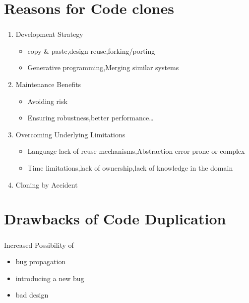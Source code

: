\documentclass[pdf]{beamer}
\begin{document}
\section{Reasons for Code clones}
\begin{frame}
\frametitle{\secname}
\begin{block}{}
\begin{enumerate}
  \item Development Strategy
  \begin{itemize}
    \item copy \& paste,design reuse,forking\slash porting
    \item Generative programming,Merging similar systems
  \end{itemize}
  \item Maintenance Benefits
  \begin{itemize}
    \item Avoiding risk
    \item Ensuring robustness,better performance\ldots
  \end{itemize}
  \item Overcoming Underlying Limitations
  \begin{itemize}
    \item Language lack of reuse mechanisms,Abstraction error-prone or complex
    \item Time limitations,lack of ownership,lack of knowledge in the domain
  \end{itemize}
  \item Cloning by Accident
\end{enumerate}
\end{block}
\end{frame}

\section{Drawbacks of Code Duplication}
\begin{frame}
\frametitle{\secname}
\begin{block}{Increased Possibility of}
\begin{itemize}
  \item bug propagation
  \item introducing a new bug
  \item bad design
\end{itemize}
\pause
\vskip11pt
\end{block}
\begin{center}
\end{center}
\end{frame}
\end{document}
